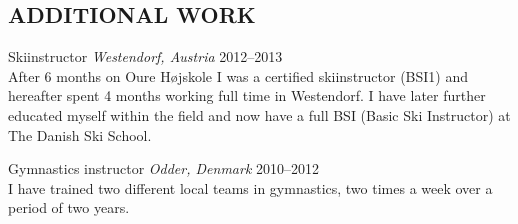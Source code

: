 \documentclass[margin, 10pt]{res} %
\begin{document}
\begin{resume}

\section{ADDITIONAL WORK}

Skiinstructor {\it Westendorf, Austria} \hfill 2012--2013 \\
After 6 months on Oure Højskole I was a certified skiinstructor (BSI1) and hereafter spent 4 months working full time in Westendorf. I have later further educated myself within the field and now have a full BSI (Basic Ski Instructor) at The Danish Ski School.

Gymnastics instructor {\it Odder, Denmark} \hfill 2010--2012 \\
I have trained two different local teams in gymnastics, two times a week over a period of two years.


\end{resume}
\end{document}
